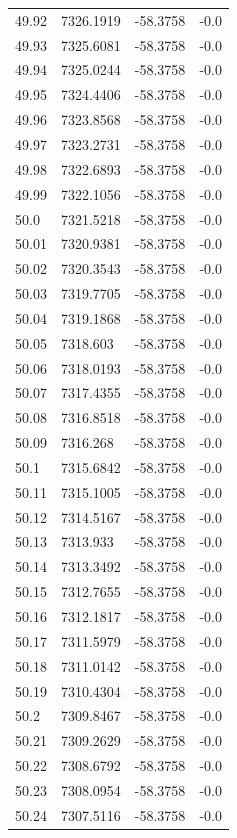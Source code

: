 \begin{table}[H]
\begin{tabular}{llll}
49.92 & 7326.1919 & -58.3758 & -0.0 \\
49.93 & 7325.6081 & -58.3758 & -0.0 \\
49.94 & 7325.0244 & -58.3758 & -0.0 \\
49.95 & 7324.4406 & -58.3758 & -0.0 \\
49.96 & 7323.8568 & -58.3758 & -0.0 \\
49.97 & 7323.2731 & -58.3758 & -0.0 \\
49.98 & 7322.6893 & -58.3758 & -0.0 \\
49.99 & 7322.1056 & -58.3758 & -0.0 \\
50.0 & 7321.5218 & -58.3758 & -0.0 \\
50.01 & 7320.9381 & -58.3758 & -0.0 \\
50.02 & 7320.3543 & -58.3758 & -0.0 \\
50.03 & 7319.7705 & -58.3758 & -0.0 \\
50.04 & 7319.1868 & -58.3758 & -0.0 \\
50.05 & 7318.603 & -58.3758 & -0.0 \\
50.06 & 7318.0193 & -58.3758 & -0.0 \\
50.07 & 7317.4355 & -58.3758 & -0.0 \\
50.08 & 7316.8518 & -58.3758 & -0.0 \\
50.09 & 7316.268 & -58.3758 & -0.0 \\
50.1 & 7315.6842 & -58.3758 & -0.0 \\
50.11 & 7315.1005 & -58.3758 & -0.0 \\
50.12 & 7314.5167 & -58.3758 & -0.0 \\
50.13 & 7313.933 & -58.3758 & -0.0 \\
50.14 & 7313.3492 & -58.3758 & -0.0 \\
50.15 & 7312.7655 & -58.3758 & -0.0 \\
50.16 & 7312.1817 & -58.3758 & -0.0 \\
50.17 & 7311.5979 & -58.3758 & -0.0 \\
50.18 & 7311.0142 & -58.3758 & -0.0 \\
50.19 & 7310.4304 & -58.3758 & -0.0 \\
50.2 & 7309.8467 & -58.3758 & -0.0 \\
50.21 & 7309.2629 & -58.3758 & -0.0 \\
50.22 & 7308.6792 & -58.3758 & -0.0 \\
50.23 & 7308.0954 & -58.3758 & -0.0 \\
50.24 & 7307.5116 & -58.3758 & -0.0 \\

\end{tabular}
\end{table}
